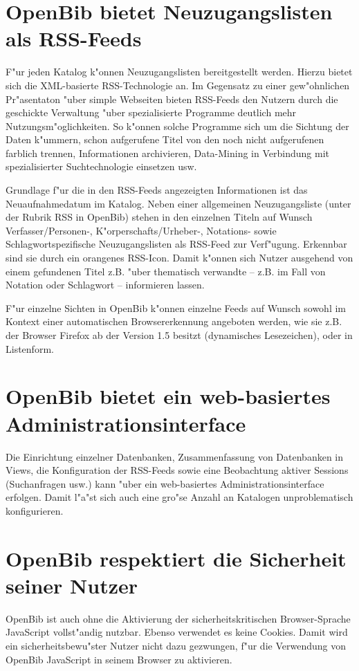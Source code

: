 \documentclass[11pt, twoside, a4paper, BCOR8mm, DIV12, bibtotoc,idxtotoc]{scrbook}
\begin{document}
\begin{itemize}
\section{OpenBib bietet Neuzugangslisten als RSS-Feeds}
F"ur jeden Katalog k"onnen Neuzugangslisten bereitgestellt werden.
Hierzu bietet sich die XML-basierte RSS-Technologie an. Im Gegensatz
zu einer gew"ohnlichen Pr"asentaton "uber simple Webseiten bieten
RSS-Feeds den Nutzern durch die geschickte Verwaltung "uber
spezialisierte Programme deutlich mehr Nutzungsm"oglichkeiten. So
k"onnen solche Programme sich um die Sichtung der Daten k"ummern,
schon aufgerufene Titel von den noch nicht aufgerufenen farblich
trennen, Informationen archivieren, Data-Mining in Verbindung mit
spezialisierter Suchtechnologie einsetzen usw.

Grundlage f"ur die in den RSS-Feeds angezeigten Informationen ist das
Neuaufnahmedatum im Katalog. Neben einer allgemeinen Neuzugangsliste
(unter der Rubrik RSS in OpenBib) stehen in den einzelnen Titeln auf
Wunsch Verfasser/Personen-, K"orperschafts/Urheber-, Notations- sowie
Schlagwortspezifische Neuzugangslisten als RSS-Feed zur Verf"ugung.
Erkennbar sind sie durch ein orangenes RSS-Icon. Damit k"onnen sich
Nutzer ausgehend von einem gefundenen Titel z.B. "uber thematisch
verwandte -- z.B. im Fall von Notation oder Schlagwort -- informieren
lassen.

F"ur einzelne Sichten in OpenBib k"onnen einzelne Feeds auf Wunsch
sowohl im Kontext einer automatischen Browsererkennung angeboten
werden, wie sie z.B. der Browser Firefox ab der Version 1.5 besitzt
(dynamisches Lesezeichen), oder in Listenform.

\section{OpenBib bietet ein web-basiertes Administrationsinterface}
Die Einrichtung einzelner Datenbanken, Zusammenfassung von Datenbanken
in Views, die Konfiguration der RSS-Feeds sowie eine Beobachtung
aktiver Sessions (Suchanfragen usw.) kann "uber ein web-basiertes
Administrationsinterface erfolgen. Damit l"a"st sich auch eine gro"se
Anzahl an Katalogen unproblematisch konfigurieren.

\section{OpenBib respektiert die Sicherheit seiner Nutzer}

OpenBib ist auch ohne die Aktivierung der sicherheitskritischen
Browser-Sprache JavaScript vollst"andig nutzbar. Ebenso verwendet es
keine Cookies. Damit wird ein sicherheitsbewu"ster Nutzer nicht dazu
gezwungen, f"ur die Verwendung von OpenBib JavaScript in seinem
Browser zu aktivieren.


\end{itemize}
\end{document}
